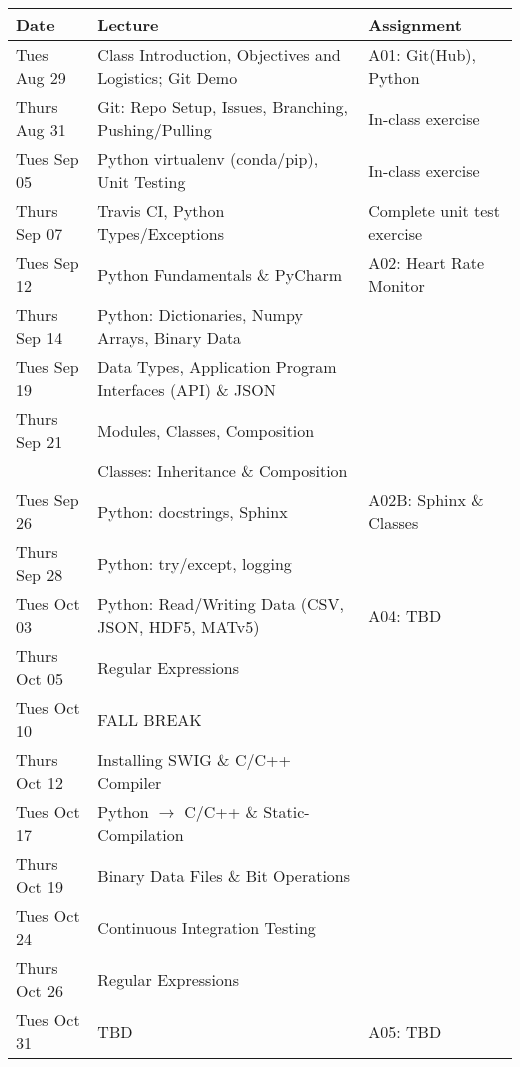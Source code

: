 \begin{longtable}[c]{|l|l|l|}

    \hline 
    
    \textbf{Date} & \textbf{Lecture} & \textbf{Assignment}\\

    \hline

    Tues Aug 29     & Class Introduction, Objectives and Logistics; Git Demo & A01: Git(Hub), Python\\
    Thurs Aug 31    & Git: Repo Setup, Issues, Branching, Pushing/Pulling & In-class exercise\\
    \hline
    Tues Sep 05     & Python virtualenv (conda/pip), Unit Testing & In-class exercise\\
    Thurs Sep 07    & Travis CI, Python Types/Exceptions & Complete unit test exercise\\
    \hline
    Tues Sep 12     & Python Fundamentals \& PyCharm & A02: Heart Rate Monitor \\
    Thurs Sep 14    & Python: Dictionaries, Numpy Arrays, Binary Data & \\
    \hline
    Tues Sep 19     & Data Types, Application Program Interfaces (API) \& JSON & \\
    Thurs Sep 21    & Modules, Classes, Composition& \\
                    & Classes: Inheritance \& Composition & \\
    \hline
    Tues Sep 26     & Python: docstrings, Sphinx & A02B: Sphinx \& Classes\\
    Thurs Sep 28    & Python: try/except, logging & \\
    \hline
    Tues Oct 03     & Python: Read/Writing Data (CSV, JSON, HDF5, MATv5) & A04: TBD\\
    Thurs Oct 05    & Regular Expressions & \\
    \hline
    Tues Oct 10     & FALL BREAK & \\
    Thurs Oct 12    & Installing SWIG \& C/C++ Compiler & \\
    \hline
    Tues Oct 17     & Python $\rightarrow$ C/C++ \& Static-Compilation & \\
    Thurs Oct 19    & Binary Data Files \& Bit Operations & \\
    \hline
    Tues Oct 24     & Continuous Integration Testing & \\
    Thurs Oct 26    & Regular Expressions & \\
    \hline
    Tues Oct 31     & TBD & A05: TBD \\

\end{longtable}
